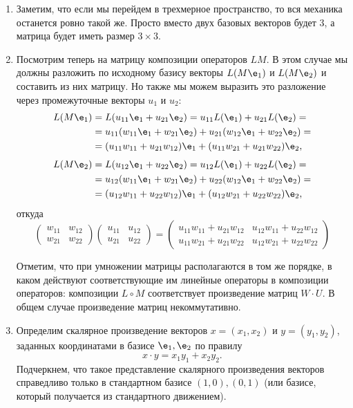 \begin{enumerate}
\item Заметим, что если мы перейдем в трехмерное пространство, то вся механика останется ровно такой же. Просто вместо двух базовых векторов будет 3, а матрица будет иметь размер $3\times 3$.
\item Посмотрим теперь на матрицу композиции операторов $LM$. В этом случае мы должны разложить по исходному базису векторы $L(M\e_1)$ и $L(M\e_2)$ и составить из них матрицу. Но также мы можем выразить это разложение через промежуточные векторы $u_1$ и $u_2$:
\begin{align*}
L(M\e_1) & = L(u_{11}\e_1+u_{21}\e_2) = u_{11}L(\e_1)+u_{21}L(\e_2) = \\
& = u_{11}(w_{11}\e_1+w_{21}\e_2) + u_{21}(w_{12}\e_1+w_{22}\e_2) = \\
& = (u_{11}w_{11}+u_{21}w_{12})\e_1 + (u_{11}w_{21}+u_{21}w_{22})\e_2,
\end{align*}
\begin{align*}
L(M\e_2) & = L(u_{12}\e_1+u_{22}\e_2) = u_{12}L(\e_1)+u_{22}L(\e_2) = \\
& = u_{12}(w_{11}\e_1+w_{21}\e_2) + u_{22}(w_{12}\e_1+w_{22}\e_2) = \\
& = (u_{12}w_{11}+u_{22}w_{12})\e_1 + (u_{12}w_{21}+u_{22}w_{22})\e_2,
\end{align*}
откуда
$$
\begin{pmatrix}
w_{11} & w_{12} \\ w_{21} & w_{22}
\end{pmatrix}
\begin{pmatrix}
u_{11} & u_{12} \\ u_{21} & u_{22}
\end{pmatrix}
=
\begin{pmatrix}
u_{11}w_{11} + u_{21}w_{12} & u_{12}w_{11} + u_{22}w_{12} \\ 
u_{11}w_{21} + u_{21}w_{22} & u_{12}w_{21} + u_{22}w_{22}
\end{pmatrix}
$$

Отметим, что при умножении матрицы располагаются в том же порядке, в каком действуют соответствующие им линейные операторы в композиции операторов: композиции $L\circ M$ соответствует произведение матриц $W\cdot U$. В общем случае произведение матриц некоммутативно.

\item Определим скалярное произведение векторов $x=(x_1,x_2)$ и $y=(y_1,y_2)$, заданных координатами в базисе $\e_1,\e_2$ по правилу
\begin{equation}\label{scal}
x\cdot y = x_1y_1+x_2y_2.
\end{equation}
Подчеркнем, что такое представление скалярного произведения векторов справедливо только в стандартном базисе $(1,0), (0,1)$ (или базисе, который получается из стандартного движением). 


\end{enumerate}
